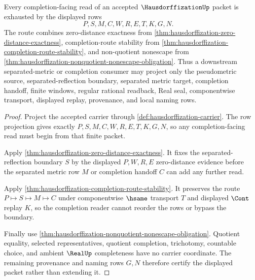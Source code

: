 \begin{theorem}
\label{thm:hausdorffization-completion-boundary-exhaustion}
Every completion-facing read of an accepted $\HausdorffizationUp$ packet is exhausted by the displayed rows
$$
P,S,M,C,W,R,E,T,K,G,N .
$$
The route combines zero-distance exactness from \autoref{thm:hausdorffization-zero-distance-exactness}, completion-route stability from \autoref{thm:hausdorffization-completion-route-stability}, and non-quotient nonescape from \autoref{thm:hausdorffization-nonquotient-nonescape-obligation}. Thus a downstream separated-metric or completion consumer may project only the pseudometric source, separated-reflection boundary, separated metric target, completion handoff, finite windows, regular rational readback, Real seal, componentwise transport, displayed replay, provenance, and local naming rows.
\end{theorem}
\begin{proof}
Project the accepted carrier through \autoref{def:hausdorffization-carrier}. The row projection gives exactly $P,S,M,C,W,R,E,T,K,G,N$, so any completion-facing read must begin from that finite packet.

Apply \autoref{thm:hausdorffization-zero-distance-exactness}. It fixes the separated-reflection boundary $S$ by the displayed $P,W,R,E$ zero-distance evidence before the separated metric row $M$ or completion handoff $C$ can add any further read.

Apply \autoref{thm:hausdorffization-completion-route-stability}. It preserves the route $P \longmapsto S \longmapsto M \longmapsto C$ under componentwise $\hsame$ transport $T$ and displayed $\Cont$ replay $K$, so the completion reader cannot reorder the rows or bypass the boundary.

Finally use \autoref{thm:hausdorffization-nonquotient-nonescape-obligation}. Quotient equality, selected representatives, quotient completion, trichotomy, countable choice, and ambient $\RealUp$ completeness have no carrier coordinate. The remaining provenance and naming rows $G,N$ therefore certify the displayed packet rather than extending it.
\end{proof}


